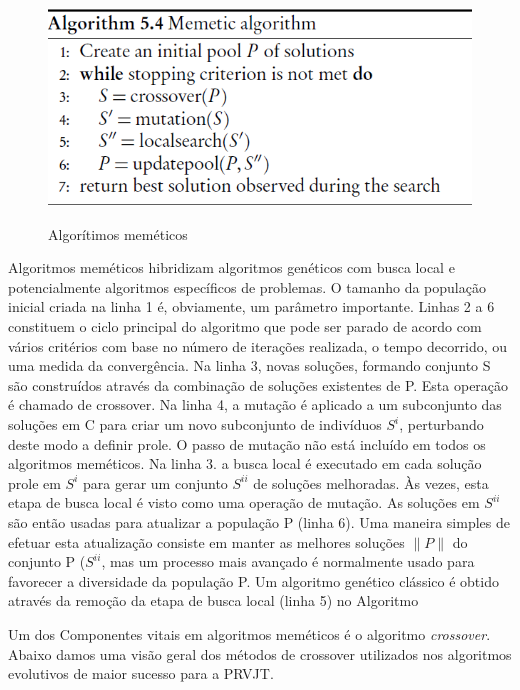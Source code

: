 \begin{figure}[ht!]
\centering
\includegraphics[scale=0.8]{figuras/alg-4.PNG}
\label{alg-4}
\caption{Algorítimos meméticos}
\end{figure}

 
Algoritmos meméticos hibridizam algoritmos genéticos com busca local e potencialmente algoritmos específicos de problemas. O tamanho da população inicial criada na linha 1 é, obviamente, um parâmetro importante. Linhas 2 a 6 constituem o ciclo principal do algoritmo que pode ser parado de acordo com vários critérios com base no número de iterações realizada, o tempo decorrido, ou uma medida da convergência. Na linha 3, novas soluções, formando conjunto S são construídos através da combinação de soluções existentes de P. Esta operação é chamado de crossover. Na linha 4, a mutação é aplicado a um subconjunto das soluções em C para criar um novo subconjunto de indivíduos $ S^{i} $, perturbando deste modo a definir prole. O passo de mutação não está incluído em todos os algoritmos meméticos. Na linha 3. a busca local é executado em cada solução prole em $ S^{i} $ para gerar um conjunto $ S^{ii} $ de soluções melhoradas. Às vezes, esta etapa de busca local é visto como uma operação de mutação. As soluções em $ S^{ii} $ são então usadas para atualizar a população P (linha 6). Uma maneira simples de efetuar esta atualização consiste em manter as melhores soluções $ \|P\| $ do conjunto P ($ S^{ii} $, mas um processo mais avançado é normalmente usado para favorecer a diversidade da população P. Um algoritmo genético clássico é obtido através da remoção da etapa de busca local (linha 5) no Algoritmo

 


Um dos Componentes vitais em algoritmos meméticos é o algoritmo \textit{crossover}. Abaixo damos uma visão geral dos métodos de crossover utilizados nos algoritmos evolutivos de maior sucesso para a PRVJT.
 


